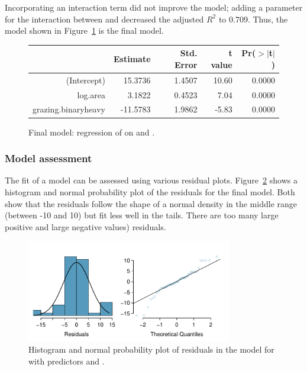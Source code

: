 Incorporating an interaction term did not improve the model; adding a parameter for the interaction between  and  decreased the adjusted $R^2$ to 0.709. Thus, the model shown in Figure~\ref{forestbirdsAbunLogAreaGrazingLevelRegress} is the final model.

\begin{figure}[ht]
	\centering
	\begin{tabular}{rrrrr}
		\hline
		& Estimate & Std. Error & t value & Pr($>$$|$t$|$) \\ 
		\hline
		(Intercept) & 15.3736 & 1.4507 & 10.60 & 0.0000 \\ 
		log.area & 3.1822 & 0.4523 & 7.04 & 0.0000 \\ 
		grazing.binaryheavy & -11.5783 & 1.9862 & -5.83 & 0.0000 \\ 
		\hline
	\end{tabular}
	\caption{Final model: regression of  on  and .}
	\label{forestbirdsAbunLogAreaGrazingLevelRegress}
\end{figure}


\textD{\newpage}


\subsubsection{Model assessment}

The fit of a model can be assessed using various residual plots. Figure~\ref{forestbirdsAbunLogAreaGrazingNormPlots} shows a histogram and normal probability plot of the residuals for the final model. Both show that the residuals follow the shape of a normal density in the middle range (between -10 and 10) but fit less well in the tails. There are too many large positive and large negative values) residuals.

 \begin{figure}[h]
 	\centering
 	\includegraphics[width=0.8\textwidth]
{ch_multiple_linear_regression_oi_biostat/figures/forestbirdsAbunLogAreaGrazingNormPlots/forestbirdsAbunLogAreaGrazingNormPlots.pdf}
     \caption{Histogram and normal probability plot of residuals in the model for  with predictors  and .}
    	\label{forestbirdsAbunLogAreaGrazingNormPlots}
 \end{figure}

